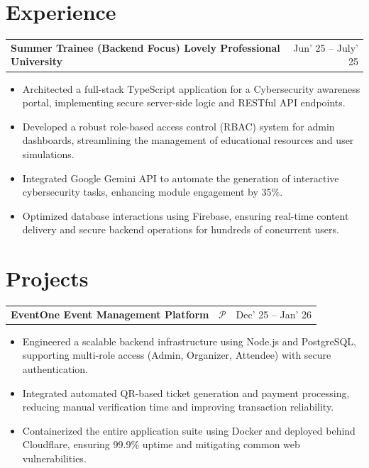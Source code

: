 \documentclass[10pt, a4paper]{article}
\makeatletter
\newcommand{\entryrow}[2]{%
  \noindent\begin{tabularx}{\linewidth}{@{}X@{\hspace{4pt}}r@{}}
    {\color{headingblue}\bfseries\fontsize{8.5pt}{10pt}\selectfont #1} &
    {\fontsize{8.5pt}{10pt}\selectfont #2}
  \end{tabularx}\par\vspace{1pt}%
}
\makeatother
\begin{document}
\section{Experience}
\entryrow{Summer Trainee (Backend Focus) \textbar{} Lovely Professional University}{Jun' 25 -- July' 25}
\begin{itemize}
  \item Architected a full-stack TypeScript application for a Cybersecurity awareness portal, implementing secure server-side logic and RESTful API endpoints.
  \item Developed a robust role-based access control (RBAC) system for admin dashboards, streamlining the management of educational resources and user simulations.
  \item Integrated Google Gemini API to automate the generation of interactive cybersecurity tasks, enhancing module engagement by 35\%.
  \item Optimized database interactions using Firebase, ensuring real-time content delivery and secure backend operations for hundreds of concurrent users.
\end{itemize}

\section{Projects}
\entryrow{EventOne \textbar{} Event Management Platform \textbar{}~\href{https://github.com/G4uravXDev}{\textcolor{linknavy}{\ensuremath{\mathcal{P}}}}}{Dec' 25 -- Jan' 26}
\begin{itemize}
  \item Engineered a scalable backend infrastructure using Node.js and PostgreSQL, supporting multi-role access (Admin, Organizer, Attendee) with secure authentication.
  \item Integrated automated QR-based ticket generation and payment processing, reducing manual verification time and improving transaction reliability.
  \item Containerized the entire application suite using Docker and deployed behind Cloudflare, ensuring 99.9\% uptime and mitigating common web vulnerabilities.
\end{itemize}
\end{document}
